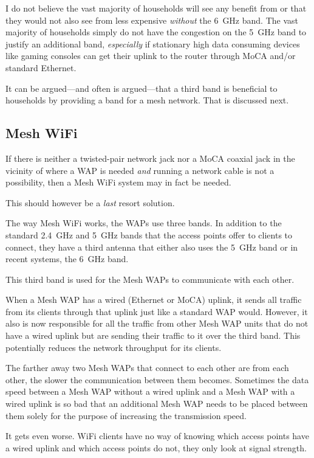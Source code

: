I do not believe the vast majority of households will see any benefit from  or  that they
would not also see from less expensive  \emph{without} the \qty{6}{\giga\hertz} band. The vast majority
of households simply do not have the congestion on the \qty{5}{\giga\hertz} band to justify an additional band,
\emph{especially} if stationary high data consuming devices like gaming consoles can get their uplink to the
router through MoCA and/or standard Ethernet.

It can be argued---and often is argued---that a third band is beneficial to households by providing a
band for a mesh network. That is discussed next.

\subsection{Mesh WiFi}

If there is neither a twisted-pair network jack nor a MoCA coaxial jack in the vicinity of where a WAP is
needed \emph{and} running a network cable is not a possibility, then a Mesh WiFi system may in fact be
needed.

This should however be a \emph{last} resort solution.

The way Mesh WiFi works, the WAPs use three bands. In addition to the standard \qty{2.4}{\giga\hertz} and
\qty{5}{\giga\hertz} bands that the access points offer to clients to connect, they have a third antenna
that either also uses the \qty{5}{\giga\hertz} band or in recent systems, the \qty{6}{\giga\hertz} band.

This third band is used for the Mesh WAPs to communicate with each other.

When a Mesh WAP has a wired (Ethernet or MoCA) uplink, it sends all traffic from its clients through
that uplink just like a standard WAP would. However, it also is now responsible for all the traffic from
other Mesh WAP units that do not have a wired uplink but are sending their traffic to it over the third band.
This potentially reduces the network throughput for its clients.

The farther away two Mesh WAPs that connect to each other are from each other, the slower the communication
between them becomes. Sometimes the data speed between a Mesh WAP without a wired uplink and a Mesh WAP with
a wired uplink is so bad that an additional Mesh WAP needs to be placed between them solely for the purpose
of increasing the transmission speed.

It gets even worse. WiFi clients have no way of knowing which access points have a wired uplink and which
access points do not, they only look at signal strength.

